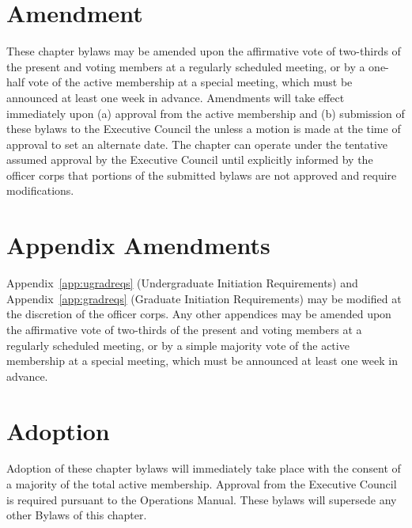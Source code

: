 

\section{Amendment} These chapter bylaws may be amended upon the affirmative vote of two-thirds of the present and voting members at a regularly scheduled meeting, or by a one-half vote of the active membership at a special meeting, which must be announced at least one week in advance. Amendments will take effect immediately upon (a) approval from the active membership and (b) submission of these bylaws to the \hkn Executive Council the unless a motion is made at the time of approval to set an alternate date. The chapter can operate under the tentative assumed approval by the \hkn Executive Council until explicitly informed by the officer corps that portions of the submitted bylaws are not approved and require modifications.
\section{Appendix Amendments} Appendix~\ref{app:ugradreqs} (Undergraduate Initiation Requirements) and Appendix~\ref{app:gradreqs} (Graduate Initiation Requirements) may be modified at the discretion of the officer corps. Any other appendices may be amended upon the affirmative vote of two-thirds of the present and voting members at a regularly scheduled meeting, or by a simple majority vote of the active membership at a special meeting, which must be announced at least one week in advance.
\section{Adoption} Adoption of these chapter bylaws will immediately take place with the consent of a majority of the total active membership. Approval from the \hkn Executive Council is required pursuant to the \hkn Operations Manual. These bylaws will supersede any other Bylaws of this chapter.

